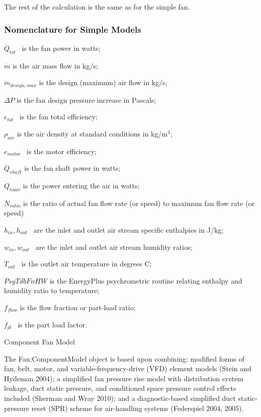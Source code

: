 The rest of the calculation is the same as for the simple fan.

\subsubsection{Nomenclature for Simple Models}\label{nomenclature-for-simple-models}

\({\dot Q_{tot}}\) ~is the fan power in watts;

\(\dot m\) is the air mass flow in kg/s;

\({\dot m_{design,max}}\) is the design (maximum) air flow in kg/s;

\(\Delta P\) is the fan design pressure increase in Pascals;

\({e_{tot}}\) ~is the fan total efficiency;

\({\rho_{air}}\) is the air density at standard conditions in kg/m\(^{3}\);

\({e_{motor}}\) ~is the motor efficiency;

\({\dot Q_{shaft}}\) is the fan shaft power in watts;

\({\dot Q_{toair}}\) is the power entering the air in watts;

\({N_{ratio}}\) is the ratio of actual fan flow rate (or speed) to maximum fan flow rate (or speed)

\({h_{in}},{h_{out}}\) ~are the inlet and outlet air stream specific enthalpies in J/kg;

\({w_{in}},{w_{out}}\) ~are the inlet and outlet air stream humidity ratios;

\({T_{out}}\) ~is the outlet air temperature in degrees C;

\(PsyTdbFnHW\) is the EnergyPlus psychrometric routine relating enthalpy and humidity ratio to temperature;

\({f_{flow}}\) is the flow fraction or part-load ratio;

\({f_{pl}}\) ~is the part load factor.

Component Fan Model

The Fan:ComponentModel object is based upon combining: modified forms of fan, belt, motor, and variable-frequency-drive (VFD) element models (Stein and Hydeman 2004); a simplified fan pressure rise model with distribution system leakage, duct static pressure, and conditioned space pressure control effects included (Sherman and Wray 2010); and a diagnostic-based simplified duct static-pressure reset (SPR) scheme for air-handling systems (Federspiel 2004, 2005).

